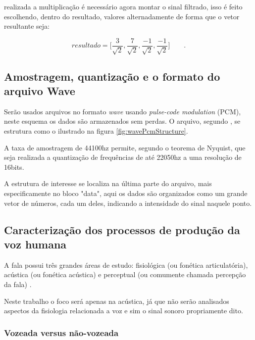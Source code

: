 \documentclass[a4paper,12pt,openright,oneside]{book}
\newenvironment{myenv}[1]
  {\begin{spacing}{#1}}
  {\end{spacing}}
\begin{document}
\begin{myenv}{1.5}
				\par realizada a multiplicação é necessário agora montar o sinal filtrado, isso é feito escolhendo, dentro do resultado, valores alternadamente de forma que o vetor resultante seja:

				\begin{equation}
					resultado = \Big[
					\frac{3}{\sqrt{2}},
					\frac{7}{\sqrt{2}},
					\frac{-1}{\sqrt{2}},
					\frac{-1}{\sqrt{2}}
					\Big]\qquad.
				\end{equation}
			
				\subsection{Amostragem, quantização e o formato do arquivo Wave}
					\par Serão usados arquivos no formato \textit{wave} usando \textit{pulse-code modulation} (PCM), neste esquema os dados são armazenados sem perdas. O arquivo, segundo \cite{WAVE2019}, se estrutura como o ilustrado na figura \ref{fig:wavePcmStructure}.
					
					\par A taxa de amostragem de 44100hz permite, segundo o teorema de Nyquist, que seja realizada a quantização de frequências de até 22050hz a uma resolução de 16bits.
				
					\par A estrutura de interesse se localiza na última parte do arquivo, mais especificamente no bloco "data", aqui os dados são organizados como um grande vetor de números, cada um deles, indicando a intensidade do sinal naquele ponto.
				\subsection{Caracterização dos processos de produção da voz humana}
					\par A fala possui três grandes áreas de estudo: fisiológica (ou fonética articulatória),  acústica  (ou fonética acústica)  e  perceptual  (ou  comumente  chamada percepção  da  fala) \cite{kremer2014eficiencia}.
					\par Neste trabalho o foco será apenas na acústica, já que não serão analisados aspectos da fisiologia relacionada a voz e sim o sinal sonoro propriamente dito.
					
					\subsubsection{Vozeada versus não-vozeada}


\end{myenv}
\end{document}
